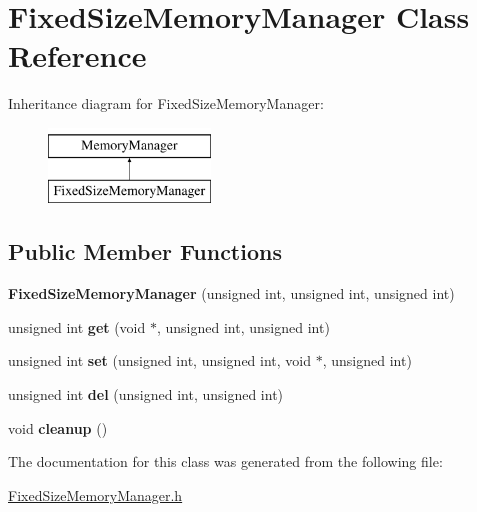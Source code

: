 \hypertarget{classFixedSizeMemoryManager}{\section{\-Fixed\-Size\-Memory\-Manager \-Class \-Reference}
\label{classFixedSizeMemoryManager}
}
\-Inheritance diagram for \-Fixed\-Size\-Memory\-Manager\-:\begin{figure}[H]
\begin{center}
\leavevmode
\includegraphics[height=2.000000cm]{classFixedSizeMemoryManager}
\end{center}
\end{figure}
\subsection*{\-Public \-Member \-Functions}
\begin{DoxyCompactItemize}
\item 
\hypertarget{classFixedSizeMemoryManager_acf48b7c18f8a244bf6d4be7c1ed188a7}{{\bfseries \-Fixed\-Size\-Memory\-Manager} (unsigned int, unsigned int, unsigned int)}\label{classFixedSizeMemoryManager_acf48b7c18f8a244bf6d4be7c1ed188a7}

\item 
\hypertarget{classFixedSizeMemoryManager_a1774fac776ce22ac217388aad902357c}{unsigned int {\bfseries get} (void $\ast$, unsigned int, unsigned int)}\label{classFixedSizeMemoryManager_a1774fac776ce22ac217388aad902357c}

\item 
\hypertarget{classFixedSizeMemoryManager_a10ce34ce45161cf96e5e1232b8f45894}{unsigned int {\bfseries set} (unsigned int, unsigned int, void $\ast$, unsigned int)}\label{classFixedSizeMemoryManager_a10ce34ce45161cf96e5e1232b8f45894}

\item 
\hypertarget{classFixedSizeMemoryManager_afad762c113d7a31766d3bff489ede569}{unsigned int {\bfseries del} (unsigned int, unsigned int)}\label{classFixedSizeMemoryManager_afad762c113d7a31766d3bff489ede569}

\item 
\hypertarget{classFixedSizeMemoryManager_a1661dd249c37ba16c409c9155985429c}{void {\bfseries cleanup} ()}\label{classFixedSizeMemoryManager_a1661dd249c37ba16c409c9155985429c}

\end{DoxyCompactItemize}


\-The documentation for this class was generated from the following file\-:\begin{DoxyCompactItemize}
\item 
\hyperlink{FixedSizeMemoryManager_8h}{\-Fixed\-Size\-Memory\-Manager.\-h}\end{DoxyCompactItemize}
